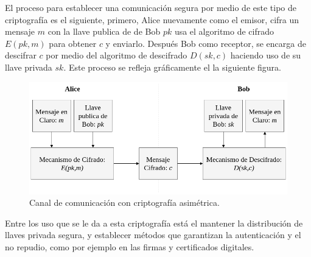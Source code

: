     El proceso para establecer una comunicación segura por medio de este tipo
    de criptografía es el siguiente, primero, Alice nuevamente como el emisor,
    cifra un mensaje $m$ con la llave publica de de Bob $pk$ usa el algoritmo
    de cifrado $E(pk,m)$ para obtener $c$ y enviarlo. Después Bob como
    receptor, se encarga de descifrar $c$ por medio del algoritmo de
    descifrado $D(sk,c)$ haciendo uso de su llave privada $sk$. Este proceso
    se refleja gráficamente el la siguiente figura.

    \begin{figure}[H]
      \begin{center}
        \includegraphics[width=0.8\linewidth]
          {contenidos/antecedentes/intro_img/cripto_asimetrica.png}
        \caption{Canal de comunicación con criptografía asimétrica.}
      \end{center}
    \end{figure}

    Entre los uso que se le da a esta criptografía está el mantener la
    distribución de llaves privada segura, y establecer métodos que garantizan
    la autenticación y el no repudio, como por ejemplo en las firmas y
    certificados digitales.
